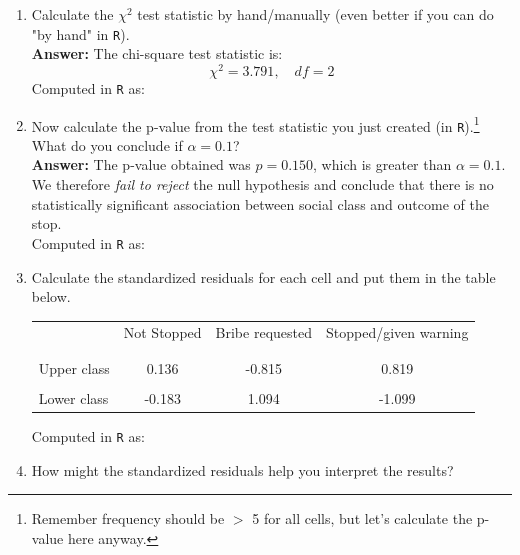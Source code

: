 \documentclass[12pt,letterpaper]{article}
\begin{document}
\begin{enumerate}
	
	\item [(a)]
	Calculate the $\chi^2$ test statistic by hand/manually (even better if you can do "by hand" in \texttt{R}).\\
	
	 \textbf{Answer:} The chi-square test statistic is:
	\[
	\chi^2 = 3.791, \quad df = 2
	\]
	Computed in \texttt{R} as:
	
	
	\item [(b)]
	Now calculate the p-value from the test statistic you just created (in \texttt{R}).\footnote{Remember frequency should be $>$ 5 for all cells, but let's calculate the p-value here anyway.}  What do you conclude if $\alpha = 0.1$?\\
	
	\textbf{Answer:} The p-value obtained was $p = 0.150$, which is greater than $\alpha = 0.1$. 
	We therefore \textit{fail to reject} the null hypothesis and conclude that there is no statistically significant association between social class and outcome of the stop.\\
	
	Computed in \texttt{R} as:
	
	
	\newpage
	\item [(c)] Calculate the standardized residuals for each cell and put them in the table below.
	\vspace{1cm}


\begin{table}[h]
	\centering
	\begin{tabular}{l | c c c }
		& Not Stopped & Bribe requested & Stopped/given warning \\
		\\[-1.8ex] 
		\hline \\[-1.8ex]
		Upper class  & 0.136 & -0.815 & 0.819 \\
		\\
		Lower class  & -0.183 & 1.094 & -1.099 \\
	\end{tabular}
\end{table}
	\vspace{1em}
	Computed in \texttt{R} as:
	
	\vspace{2cm}
	
	\item [(d)] How might the standardized residuals help you interpret the results?  
	

\end{enumerate}
\end{document}
